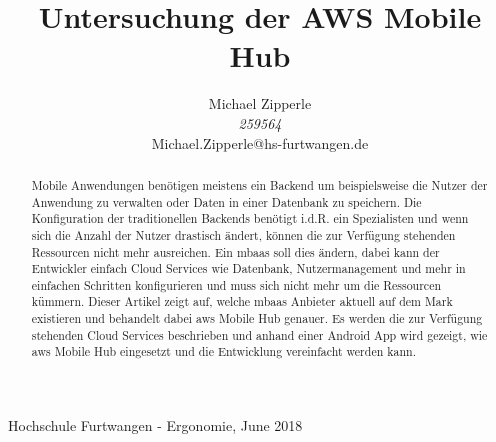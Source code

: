 \documentclass[journal]{IEEEtran}
\begin{document}
\title{Untersuchung der AWS Mobile Hub}

\author{\begin{center}
 Michael Zipperle \\ 
 \textit{259564} \\
 Michael.Zipperle@hs-furtwangen.de \\
\end{center}}%
        
%
{Hochschule Furtwangen - Ergonomie, June 2018}

\maketitle


\begin{abstract}
Mobile Anwendungen benötigen meistens ein Backend um beispielsweise die Nutzer der Anwendung zu verwalten oder Daten in einer Datenbank zu speichern. Die Konfiguration der traditionellen Backends benötigt i.d.R. ein Spezialisten und wenn sich die Anzahl der Nutzer drastisch ändert, können die zur Verfügung stehenden Ressourcen nicht mehr ausreichen. Ein \gls{mbaas} soll dies ändern, dabei kann der Entwickler einfach Cloud Services wie Datenbank, Nutzermanagement und mehr in einfachen Schritten konfigurieren und muss sich nicht mehr um die Ressourcen kümmern. Dieser Artikel zeigt auf, welche \gls{mbaas} Anbieter aktuell auf dem Mark existieren und behandelt dabei \gls{aws} Mobile Hub genauer. Es werden die zur Verfügung stehenden Cloud Services beschrieben und anhand einer Android App wird gezeigt, wie \gls{aws} Mobile Hub eingesetzt und die Entwicklung vereinfacht werden kann.

\end{abstract}


\IEEEpeerreviewmaketitle









\end{document}
